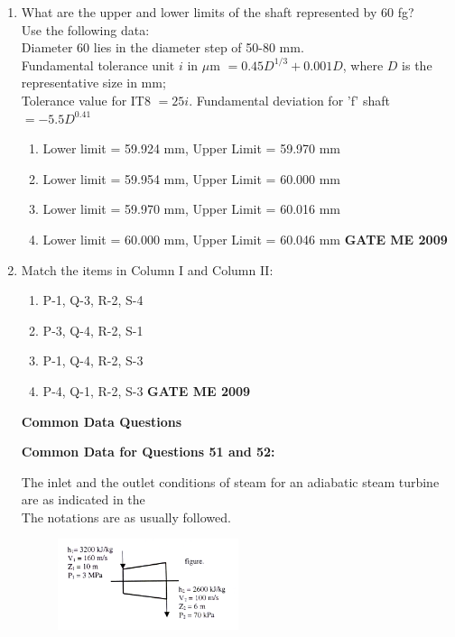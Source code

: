 \documentclass[journal]{IEEEtran}
\begin{document}
\begin{enumerate}[leftmargin=0pt]
\item What are the upper and lower limits of the shaft represented by 60 fg?\\ Use the following data:
\\ Diameter 60 lies in the diameter step of 50-80 mm. \\
Fundamental tolerance unit $i$ in $\mu$m $= 0.45 D^{1/3} + 0.001 D$, where $D$ is the representative size in mm; \\
Tolerance value for IT8 $= 25i$. Fundamental deviation for 'f' shaft $= -5.5 D^{0.41}$
\begin{enumerate}[label=(\Alph*)]
  \item Lower limit = 59.924 mm, Upper Limit = 59.970 mm
  \item Lower limit = 59.954 mm, Upper Limit = 60.000 mm
  \item Lower limit = 59.970 mm, Upper Limit = 60.016 mm
  \item Lower limit = 60.000 mm, Upper Limit = 60.046 mm
\hfill{\textbf{GATE ME 2009}}
\end{enumerate}

\item Match the items in Column I and Column II:\\
\begin{table}[h]
    \centering
    
   
\end{table}
\begin{enumerate}[label=(\Alph*)]
  \item P-1, Q-3, R-2, S-4
  \item P-3, Q-4, R-2, S-1
  \item P-1, Q-4, R-2, S-3
  \item P-4, Q-1, R-2, S-3
  \hfill{\textbf{GATE ME 2009}}
\end{enumerate}

\textbf{Common Data Questions}

\textbf{Common Data for Questions 51 and 52:}

The inlet and the outlet conditions of steam for an adiabatic steam turbine are as indicated in the\\
The notations are as usually followed.
\begin{figure}[h]
  \centering
  \includegraphics[width=0.5\textwidth]{Figs/image (11).png}
  \caption{}
\end{figure}


\end{enumerate}
\end{document}
